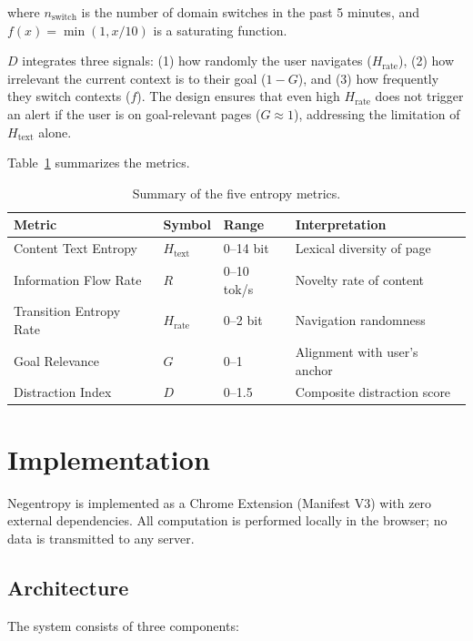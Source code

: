\documentclass[10pt,letterpaper]{article}
\begin{document}
where $n_{\text{switch}}$ is the number of domain switches in the past 5 minutes, and $f(x) = \min(1, x/10)$ is a saturating function.

$D$ integrates three signals: (1) how randomly the user navigates ($H_{\text{rate}}$), (2) how irrelevant the current context is to their goal ($1 - G$), and (3) how frequently they switch contexts ($f$). The design ensures that even high $H_{\text{rate}}$ does not trigger an alert if the user is on goal-relevant pages ($G \approx 1$), addressing the limitation of $H_{\text{text}}$ alone.

Table~\ref{tab:metrics} summarizes the metrics.

\begin{table}[t]
\centering
\caption{Summary of the five entropy metrics.}
\label{tab:metrics}
\small
\begin{tabular}{@{}lllp{3.8cm}@{}}
\toprule
\textbf{Metric} & \textbf{Symbol} & \textbf{Range} & \textbf{Interpretation} \\
\midrule
Content Text Entropy & $H_{\text{text}}$ & 0--14 bit & Lexical diversity of page \\
Information Flow Rate & $R$ & 0--10 tok/s & Novelty rate of content \\
Transition Entropy Rate & $H_{\text{rate}}$ & 0--2 bit & Navigation randomness \\
Goal Relevance & $G$ & 0--1 & Alignment with user's anchor \\
Distraction Index & $D$ & 0--1.5 & Composite distraction score \\
\bottomrule
\end{tabular}
\end{table}

\section{Implementation}
\label{sec:implementation}

Negentropy is implemented as a Chrome Extension (Manifest V3) with zero external dependencies. All computation is performed locally in the browser; no data is transmitted to any server.

\subsection{Architecture}

The system consists of three components:
\end{document}
